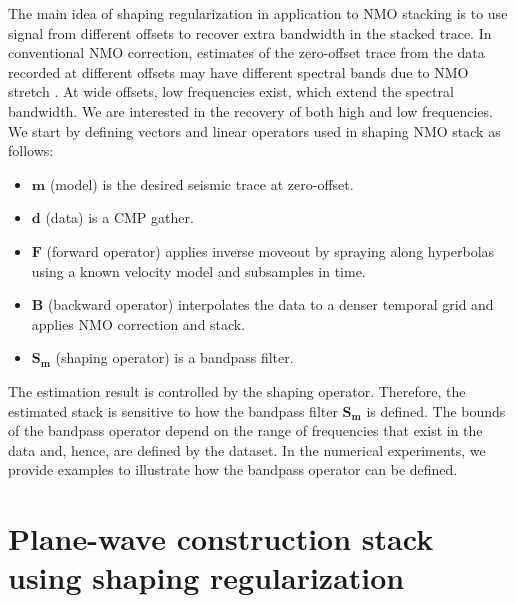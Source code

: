 The main idea of shaping regularization in application to NMO stacking is to use signal from different 
offsets to recover extra bandwidth in the stacked trace. In conventional NMO correction, estimates 
of the zero-offset trace from the data recorded at different offsets may have different spectral bands 
due to NMO stretch \cite[]{claerbout2}. At wide offsets, low frequencies exist, which extend the
spectral bandwidth. We are interested in the recovery of both high and low frequencies. 
We start by defining vectors and linear operators used in shaping NMO stack as follows:
\begin{itemize}
\item{$\mathbf{m}$ (model) is the desired seismic trace at zero-offset.}

\item{$\mathbf{d}$ (data) is a CMP gather.}

\item{$\mathbf{F}$ (forward operator) applies inverse moveout by spraying along hyperbolas using a known velocity model and subsamples in time.}

\item{$\mathbf{B}$ (backward operator) interpolates the data to a denser temporal grid and applies NMO correction and stack.}

\item{$\mathbf{S_m}$ (shaping operator) is a bandpass filter.}
\end{itemize}
The estimation result is controlled by the shaping operator. Therefore, the estimated stack is sensitive to how the 
bandpass filter $\mathbf{S_m}$ is defined. The bounds of the bandpass operator depend
on the range of frequencies that exist in the data and, hence, are defined by the dataset. 
In the numerical experiments, we provide examples to illustrate how the 
bandpass operator can be defined.   


\section{Plane-wave construction stack using shaping regularization}

